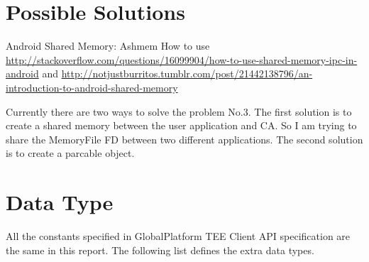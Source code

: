 \documentclass{cseminar}
\begin{document}
\section{Possible Solutions}
Android Shared Memory: Ashmem
How to use \url{http://stackoverflow.com/questions/16099904/how-to-use-shared-memory-ipc-in-android} and \url{http://notjustburritos.tumblr.com/post/21442138796/an-introduction-to-android-shared-memory}

Currently there are two ways to solve the problem No.3. The first solution is to create a shared memory between the user application and CA. So I am trying to share the MemoryFile FD between two different applications. The second solution is to create a parcable object.

\section{Data Type}
All the constants specified in GlobalPlatform TEE Client API specification are the same in this report. The following list defines the extra data types.
\end{document}
